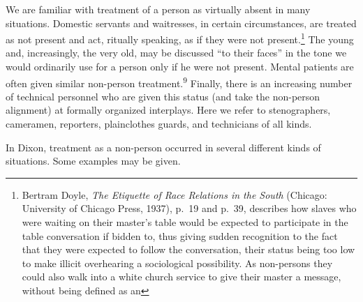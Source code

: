 \documentclass[twoside,symmetric,nobib,justified]{tufte-book}
\begin{document}
\noindent We are familiar with treatment of a person as virtually absent in many
situations. Domestic servants and waitresses, in certain circumstances,
are treated as not present and act, ritually speaking, as if they were
not present.\footnote{Bertram Doyle, \emph{The Etiquette of Race
  Relations in the South} (Chicago: University of Chicago Press, 1937),
  p.~19 and p.~39, describes how slaves who were waiting on their
  master's table would be expected to participate in the table
  conversation if bidden to, thus giving sudden recognition to the fact
  that they were expected to follow the conversation, their status being
  too low to make illicit overhearing a sociological possibility. As
  non-persons they could also walk into a white church service to give
  their master a message, without being defined as an} The young and, increasingly, the very old, may be
discussed ``to their faces'' in the tone we would ordinarily use for a
person only if he were not present. Mental patients are often given
similar non-person treatment.\textsuperscript{9} Finally, there is an
increasing number of technical personnel who are given this status (and
take the non-person alignment) at formally organized interplays. Here we
refer to stenographers, cameramen, reporters, plainclothes guards, and
technicians of all kinds.

In Dixon, treatment as a non-person occurred in several different kinds
of situations. Some examples may be given.
\end{document}
